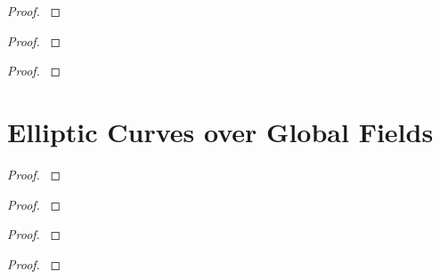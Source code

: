 \documentclass[12pt,reqno]{amsart}
\begin{document}
\begin{exe}\label{7.13}

\begin{proof}\label{s7.13}

\end{proof} 
\end{exe} 

\begin{exe}\label{7.14}

\begin{proof}\label{s7.14}

\end{proof} 
\end{exe} 

\begin{exe}\label{7.15}

\begin{proof}\label{s7.15}

\end{proof} 
\end{exe} 


\newpage
\section{Elliptic Curves over Global Fields}\label{8}

\begin{exe}\label{8.1}

\begin{proof}\label{s8.1}

\end{proof} 
\end{exe} 

\begin{exe}\label{8.2}

\begin{proof}\label{s8.2}

\end{proof} 
\end{exe} 

\begin{exe}\label{8.3}

\begin{proof}\label{s8.3}

\end{proof} 
\end{exe} 

\begin{exe}\label{8.4}	

\begin{proof}\label{s8.4}

\end{proof} 
\end{exe} 
\end{document}
